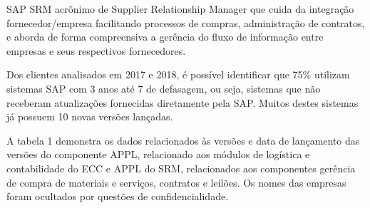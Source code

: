 SAP SRM acrônimo de Supplier Relationship Manager que cuida da integração fornecedor/empresa facilitando processos de compras, administração de contratos, e aborda de forma compreensiva a gerência do fluxo de informação entre empresas e seus respectivos fornecedores. \cite{BOEDER2014}

Dos clientes analisados em 2017 e 2018, é possível identificar que 75\% utilizam sistemas SAP com 3 anos até 7 de defasagem, ou seja, sistemas que não receberam atualizações fornecidas diretamente pela SAP. Muitos destes sistemas já possuem 10 novas versões lançadas.

A tabela 1 demonstra os dados relacionados às versões e data de lançamento das versões do componente APPL, relacionado aos módulos de logística e contabilidade do ECC e APPL do SRM, relacionados aos componentes gerência de compra de materiais e serviços, contratos e leilões. Os nomes das empresas foram ocultados por questões de confidencialidade.


